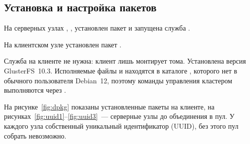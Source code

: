 \subsection{Установка и настройка пакетов}

На серверных узлах , ,  установлен пакет  и запущена служба .

На клиентском узле  установлен пакет .

Служба  на клиенте не нужна: клиент лишь монтирует тома. Установлена версия GlusterFS~10.3. Исполняемые файлы  и  находятся в каталоге , которого нет в  обычного пользователя Debian~12, поэтому команды управления кластером выполняются через .

На рисунке~\ref{fig:dpkg} показаны установленные пакеты на клиенте, на рисунках~\ref{fig:uuid1}--\ref{fig:uuid3}~--- серверные узлы до объединения в пул. У каждого узла собственный уникальный идентификатор (UUID), без этого пул собрать невозможно.

